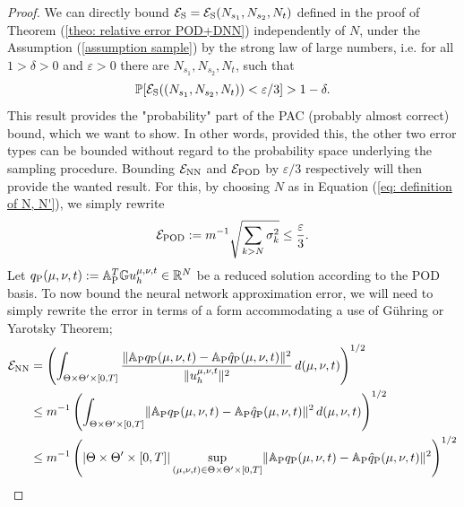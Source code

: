 \begin{proof}
    We can directly bound $\mathcal{E}_\text{S} = \mathcal{E}_\text{S}(N_{s_1}, N_{s_2}, N_t)$ defined in the proof
    of Theorem (\ref{theo: relative error POD+DNN}) independently of $N$, under the 
    Assumption (\ref{assumption sample})
    by the strong law of large numbers, i.e. for all $1 > \delta > 0$ and $\varepsilon > 0$ there are 
    $N_{s_1}, N_{s_2}, N_t$, such that
    \begin{equation} \label{eq: bound on S error pod-dl-rom}
        \mathbb{P}[\mathcal{E}_\text{S}((N_{s_1}, N_{s_2}, N_t)) < \varepsilon / 3] > 1 - \delta.
    \end{equation}
    This result provides the "probability" part of the PAC (probably almost correct) bound, which we want to show. 
    In other words, provided this, the other two error types can be bounded without regard to the probability
    space underlying the sampling procedure.
    Bounding $\mathcal{E}_{\text{NN}}$ and $\mathcal{E}_{\text{POD}}$
    by $\varepsilon / 3$ respectively will then provide the wanted result.
    For this, by choosing $N$ as in Equation (\ref{eq: definition of N, N'}),
    we simply rewrite
    \begin{equation} \label{eq: bound on POD error pod-dl-rom}
        \mathcal{E}_{\text{POD}} := m^{-1} \sqrt{\sum_{k > N} \sigma_k^2} \leq \frac{\varepsilon}{3}.
    \end{equation}
    Let $q_\text{P}(\mu, \nu, t) := \mathbb{A}_\text{P}^T \mathbb{G} u_h^{\mu, \nu, t} \in \mathbb{R}^N$ be a reduced solution according to the POD basis. 
    To now bound the neural network approximation error, 
    we will need to simply rewrite the error in terms of a form accommodating a use of Gühring or Yarotsky Theorem;
    \begin{equation} \label{eq:nn error for pod-dl-rom}
        \begin{aligned}
            \Ecal_{\text{NN}} &= \left( \int_{\Theta \times \Theta' \times [0, T]} 
            \frac{\norm{\A_\text{P} q_\text{P}(\mu, \nu, t) - \A_\text{P} \hat{q}_\text{P}(\mu, \nu, t)}^2}{\norm{\uht}^2}
            \, d(\mu, \nu, t) \right)^{1/2} \\
            &\leq m^{-1} \left( \int_{\Theta \times \Theta' \times [0, T]} 
            \norm{\A_\text{P} q_\text{P}(\mu, \nu, t) - \A_\text{P} \hat{q}_\text{P}(\mu, \nu, t)}^2 \, d(\mu, \nu, t) \right)^{1/2} \\
            &\leq m^{-1} \left( \left| \Theta \times \Theta' \times [0, T] \right| 
            \sup_{(\mu, \nu, t) \in \Theta \times \Theta' \times [0, T]} 
            \norm{\A_\text{P} q_\text{P}(\mu, \nu, t) - \A_\text{P} \hat{q}_\text{P}(\mu, \nu, t)}^2 \right)^{1/2} \\

\end{aligned}
\end{equation}
\end{proof}
